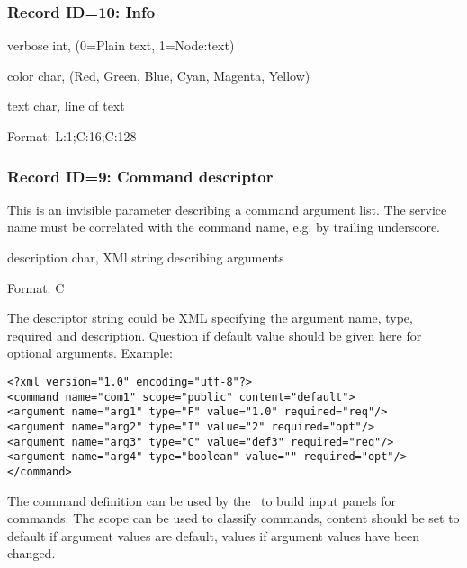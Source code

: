 \subsubsection{Record ID=10: Info}
\begin{compactdesc}
\item[verbose]   int,  (0=Plain text, 1=Node:text)
\item[color]   char,  (Red, Green, Blue, Cyan, Magenta, Yellow)
\item[text]   char,  line of text
\item[Format:] L:1;C:16;C:128
\end{compactdesc}

\subsubsection{Record ID=9: Command descriptor}
This is an invisible parameter describing a command argument list. The service name must be correlated with the command name, e.g. by trailing underscore.
\begin{compactdesc}
\item[description]   char,  XMl string describing arguments
\item[Format:] C
\end{compactdesc}

The descriptor string could be XML specifying the argument name, type, required and description. Question if default value should be given here for optional arguments. Example:
\begin{verbatim}
<?xml version="1.0" encoding="utf-8"?>
<command name="com1" scope="public" content="default">
<argument name="arg1" type="F" value="1.0" required="req"/>
<argument name="arg2" type="I" value="2" required="opt"/>
<argument name="arg3" type="C" value="def3" required="req"/>
<argument name="arg4" type="boolean" value="" required="opt"/>
</command>
\end{verbatim}
The command definition can be used by the \gui~to build input panels for commands. The scope can be used to classify commands, content should be set to default if argument values are default, values if argument values have been changed.
